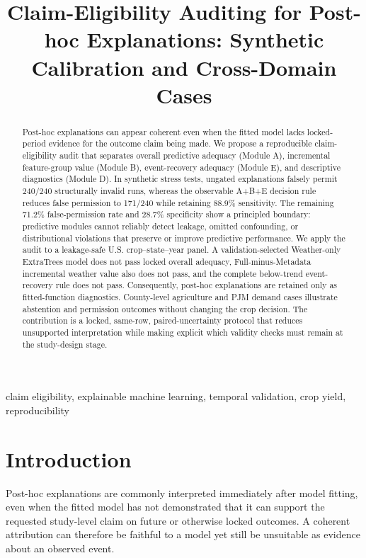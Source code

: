 \documentclass[conference]{IEEEtran}
\title{Claim-Eligibility Auditing for Post-hoc Explanations: Synthetic Calibration and Cross-Domain Cases}
\author{\IEEEauthorblockN{Anonymous Submission}}
\begin{document}
\maketitle

\begin{abstract}
Post-hoc explanations can appear coherent even when the fitted model lacks
locked-period evidence for the outcome claim being made. We propose a
reproducible claim-eligibility audit that separates overall predictive adequacy
(Module A), incremental feature-group value (Module B), event-recovery adequacy
(Module E), and descriptive diagnostics (Module D). In synthetic stress tests,
ungated explanations falsely permit 240/240 structurally invalid runs, whereas
the observable A+B+E decision rule reduces false permission to 171/240 while
retaining 88.9\% sensitivity. The remaining 71.2\% false-permission rate and
28.7\% specificity show a principled boundary: predictive modules cannot
reliably detect leakage, omitted confounding, or distributional violations that
preserve or improve predictive performance. We apply the audit to a leakage-safe
U.S. crop--state--year panel. A validation-selected Weather-only ExtraTrees
model does not pass locked overall adequacy, Full-minus-Metadata incremental
weather value also does not pass, and the complete below-trend event-recovery
rule does not pass. Consequently, post-hoc explanations are retained only as
fitted-function diagnostics. County-level agriculture and PJM demand cases
illustrate abstention and permission outcomes without changing the crop
decision. The contribution is a locked, same-row, paired-uncertainty protocol
that reduces unsupported interpretation while making explicit which validity
checks must remain at the study-design stage.
\end{abstract}

\begin{IEEEkeywords}
claim eligibility, explainable machine learning, temporal validation, crop yield,
reproducibility
\end{IEEEkeywords}

\section{Introduction}
Post-hoc explanations are commonly interpreted immediately after model fitting,
even when the fitted model has not demonstrated that it can support the requested
study-level claim on future or otherwise locked outcomes. A coherent attribution
can therefore be faithful to a model yet still be unsuitable as evidence about an
observed event.
\end{document}
